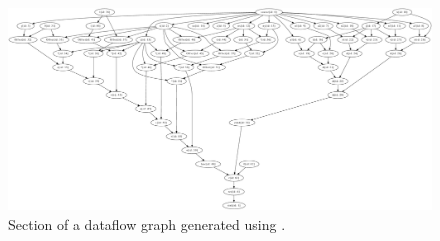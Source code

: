 \begin{figure}
  \centering
  \includegraphics[scale=0.5, clip=true, trim=880 740 650 0]{figs/MaxCtemplateDFG.png}
  \caption{Section of a dataflow graph generated using \fastc{}.}
  \label{fig:fast-dfg}
\end{figure}